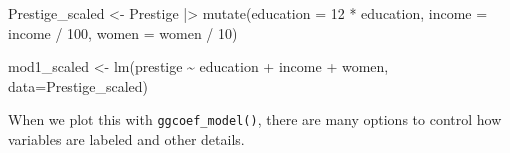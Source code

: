 \documentclass[
  letterpaper,
  10pt,
  krantz2]{krantz}
\makeatletter
\newenvironment{Shaded}{\begin{snugshade}}{\end{snugshade}}
\newcommand{\AttributeTok}[1]{\textcolor[rgb]{0.40,0.45,0.13}{#1}}
\newcommand{\ConstantTok}[1]{\textcolor[rgb]{0.56,0.35,0.01}{#1}}
\newcommand{\DecValTok}[1]{\textcolor[rgb]{0.68,0.00,0.00}{#1}}
\newcommand{\FunctionTok}[1]{\textcolor[rgb]{0.28,0.35,0.67}{#1}}
\newcommand{\NormalTok}[1]{\textcolor[rgb]{0.00,0.23,0.31}{#1}}
\newcommand{\OtherTok}[1]{\textcolor[rgb]{0.00,0.23,0.31}{#1}}
\newcommand{\SpecialCharTok}[1]{\textcolor[rgb]{0.37,0.37,0.37}{#1}}
\newcommand{\StringTok}[1]{\textcolor[rgb]{0.13,0.47,0.30}{#1}}
\newenvironment{kframe}{%
  \medskip{}
  \setlength{\fboxsep}{.8em}
  \def\at@end@of@kframe{}%
  \ifinner\ifhmode%
  \def\at@end@of@kframe{\end{minipage}}%
  \begin{minipage}{\columnwidth}%
  \fi\fi%
  \def\FrameCommand##1{\hskip\@totalleftmargin \hskip-\fboxsep
  \colorbox{shadecolor}{##1}\hskip-\fboxsep
      \hskip-\linewidth \hskip-\@totalleftmargin \hskip\columnwidth}%
  \MakeFramed {\advance\hsize-\width
    \@totalleftmargin\z@ \linewidth\hsize
    \@setminipage}}%
{\par\unskip\endMakeFramed%
  \at@end@of@kframe}
\renewenvironment{Shaded}{\begin{kframe}}{\end{kframe}}
\makeatother
\begin{document}
\begin{Shaded}
\begin{Highlighting}[]
\NormalTok{Prestige\_scaled }\OtherTok{\textless{}{-}}\NormalTok{ Prestige }\SpecialCharTok{|\textgreater{}}
  \FunctionTok{mutate}\NormalTok{(}\AttributeTok{education =} \DecValTok{12} \SpecialCharTok{*}\NormalTok{ education,}
         \AttributeTok{income =}\NormalTok{ income }\SpecialCharTok{/} \DecValTok{100}\NormalTok{,}
         \AttributeTok{women =}\NormalTok{ women }\SpecialCharTok{/} \DecValTok{10}\NormalTok{)}

\NormalTok{mod1\_scaled }\OtherTok{\textless{}{-}} \FunctionTok{lm}\NormalTok{(prestige }\SpecialCharTok{\textasciitilde{}}\NormalTok{ education }\SpecialCharTok{+}\NormalTok{ income }\SpecialCharTok{+}\NormalTok{ women,}
                  \AttributeTok{data=}\NormalTok{Prestige\_scaled)}
\end{Highlighting}
\end{Shaded}

When we plot this with \texttt{ggcoef\_model()}, there are many options
to control how variables are labeled and other details.

\begin{Shaded}
\end{Shaded}
\end{document}
